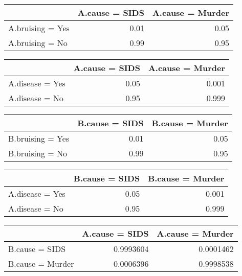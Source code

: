 \documentclass{article}
\begin{document}
\begin{table}[H]
\centering
\begin{tabular}{lrr}
\toprule
  & A.cause = SIDS & A.cause = Murder\\
\midrule
A.bruising = Yes & 0.01 & 0.05\\
A.bruising = No & 0.99 & 0.95\\
\bottomrule
\end{tabular}
\end{table}

\begin{table}[H]
\centering
\begin{tabular}{lrr}
\toprule
  & A.cause = SIDS & A.cause = Murder\\
\midrule
A.disease = Yes & 0.05 & 0.001\\
A.disease = No & 0.95 & 0.999\\
\bottomrule
\end{tabular}
\end{table}

\begin{table}[H]
\centering
\begin{tabular}{lrr}
\toprule
  & B.cause = SIDS & B.cause = Murder\\
\midrule
B.bruising = Yes & 0.01 & 0.05\\
B.bruising = No & 0.99 & 0.95\\
\bottomrule
\end{tabular}
\end{table}

\begin{table}[H]
\centering
\begin{tabular}{lrr}
\toprule
  & B.cause = SIDS & B.cause = Murder\\
\midrule
A.disease = Yes & 0.05 & 0.001\\
A.disease = No & 0.95 & 0.999\\
\bottomrule
\end{tabular}
\end{table}

\begin{table}[H]
\centering
\begin{tabular}{lrr}
\toprule
  & A.cause = SIDS & A.cause = Murder\\
\midrule
B.cause = SIDS & 0.9993604 & 0.0001462\\
B.cause = Murder & 0.0006396 & 0.9998538\\
\bottomrule
\end{tabular}
\end{table}
\end{document}
